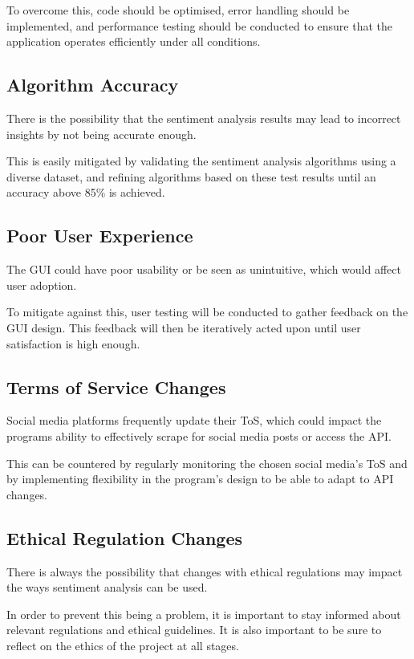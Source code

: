     To overcome this, code should be optimised, error handling should be implemented, and performance testing should be conducted to ensure that the application operates efficiently under all conditions.

    \subsection{Algorithm Accuracy}
    There is the possibility that the sentiment analysis results may lead to incorrect insights by not being accurate enough.

    This is easily mitigated by validating the sentiment analysis algorithms using a diverse dataset, and refining algorithms based on these test results until an accuracy above 85\% is achieved. 

    \subsection{Poor User Experience}
    The GUI could have poor usability or be seen as unintuitive, which would affect user adoption.

    To mitigate against this, user testing will be conducted to gather feedback on the GUI design. This feedback will then be iteratively acted upon until user satisfaction is high enough.

    \subsection{Terms of Service Changes}
    Social media platforms frequently update their ToS, which could impact the programs ability to effectively scrape for social media posts or access the API.

    This can be countered by regularly monitoring the chosen social media's ToS and by implementing flexibility in the program's design to be able to adapt to API changes.

    \subsection{Ethical Regulation Changes}
    There is always the possibility that changes with ethical regulations may impact the ways sentiment analysis can be used.

    In order to prevent this being a problem, it is important to stay informed about relevant regulations and ethical guidelines. It is also important to be sure to reflect on the ethics of the project at all stages.



